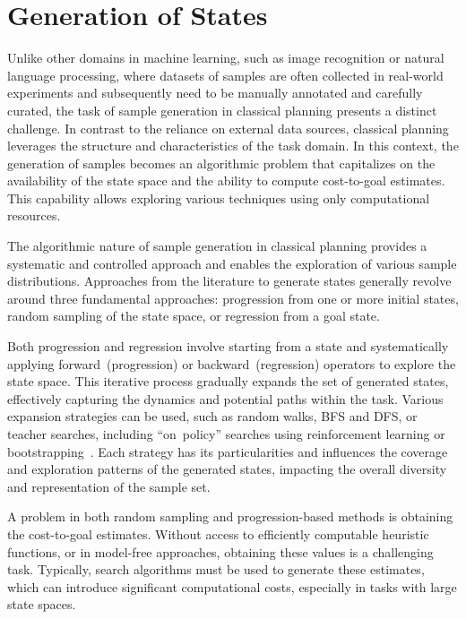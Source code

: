 \section{Generation of States}
\label{sec:state-generation}

Unlike other domains in machine learning, such as image recognition or natural language processing, where datasets of samples are often collected in real-world experiments and subsequently need to be manually annotated and carefully curated, the task of sample generation in classical planning presents a distinct challenge. In contrast to the reliance on external data sources, classical planning leverages the structure and characteristics of the task domain. In this context, the generation of samples becomes an algorithmic problem that capitalizes on the availability of the state space and the ability to compute cost-to-goal estimates. This capability allows exploring various techniques using only computational resources.

The algorithmic nature of sample generation in classical planning provides a systematic and controlled approach and enables the exploration of various sample distributions. Approaches from the literature to generate states generally revolve around three fundamental approaches: progression from one or more initial states, random sampling of the state space, or regression from a goal state.

Both progression and regression involve starting from a state and systematically applying forward~(progression) or backward~(regression) operators to explore the state space. This iterative process gradually expands the set of generated states, effectively capturing the dynamics and potential paths within the task. Various expansion strategies can be used, such as random walks, BFS and DFS, or teacher searches, including ``on~policy'' searches using reinforcement learning or bootstrapping~\cite{arfaee2011learning}. Each strategy has its particularities and influences the coverage and exploration patterns of the generated states, impacting the overall diversity and representation of the sample set.

A problem in both random sampling and progression-based methods is obtaining the cost-to-goal estimates. Without access to efficiently computable heuristic functions, or in model-free approaches, obtaining these values is a challenging task. Typically, search algorithms must be used to generate these estimates, which can introduce significant computational costs, especially in tasks with large state spaces.

